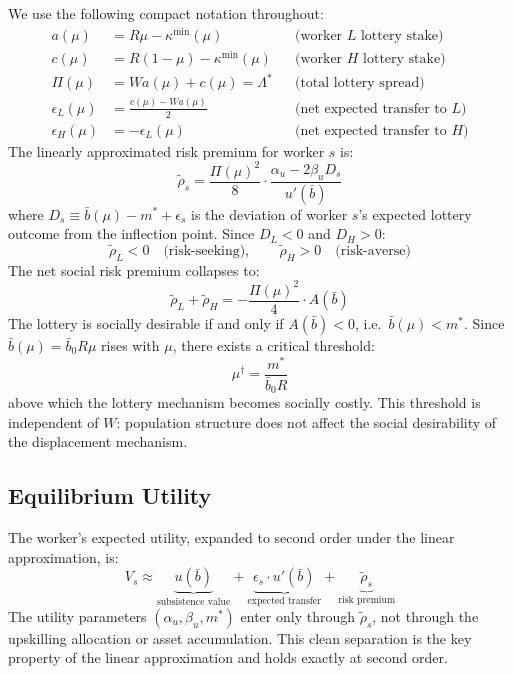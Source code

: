 \documentclass[12pt,a4paper]{article}
\begin{document}
We use the following compact notation throughout:
\begin{align}
  a(\mu) &= R\mu - \kappa^{\min}(\mu)
  && \text{(worker $L$ lottery stake)} \label{eq:a} \\
  c(\mu) &= R(1-\mu) - \kappa^{\min}(\mu)
  && \text{(worker $H$ lottery stake)} \label{eq:c} \\
  \Pi(\mu) &= Wa(\mu) + c(\mu) = \Lambda^*
  && \text{(total lottery spread)} \label{eq:Pi} \\
  \epsilon_L(\mu) &= \tfrac{c(\mu) - Wa(\mu)}{2}
  && \text{(net expected transfer to $L$)} \label{eq:epsilonL} \\
  \epsilon_H(\mu) &= -\epsilon_L(\mu)
  && \text{(net expected transfer to $H$)} \label{eq:epsilonH}
\end{align}
The linearly approximated risk premium for worker $s$ is:
\begin{equation}
  \tilde{\rho}_s = \frac{\Pi(\mu)^2}{8} \cdot
  \frac{\alpha_u - 2\beta_u D_s}{u'(\bar{b})}
  \label{eq:rho_linear}
\end{equation}
where $D_s \equiv \bar{b}(\mu) - m^* + \epsilon_s$ is the deviation of
worker $s$'s expected lottery outcome from the inflection point.
Since $D_L < 0$ and $D_H > 0$:
\begin{equation}
  \tilde{\rho}_L < 0 \quad \text{(risk-seeking)},
  \qquad
  \tilde{\rho}_H > 0 \quad \text{(risk-averse)}
  \label{eq:rho_signs}
\end{equation}
The net social risk premium collapses to:
\begin{equation}
  \tilde{\rho}_L + \tilde{\rho}_H
  = -\frac{\Pi(\mu)^2}{4} \cdot A(\bar{b})
  \label{eq:social_premium}
\end{equation}
The lottery is socially desirable if and only if $A(\bar{b}) < 0$,
i.e.\ $\bar{b}(\mu) < m^*$. Since $\bar{b}(\mu) = \bar{b}_0 R\mu$
rises with $\mu$, there exists a critical threshold:
\begin{equation}
  \mu^\dagger = \frac{m^*}{\bar{b}_0 R}
  \label{eq:mu_dagger}
\end{equation}
above which the lottery mechanism becomes socially costly. This
threshold is independent of $W$: population structure does not affect
the social desirability of the displacement mechanism.

\subsection{Equilibrium Utility}

The worker's expected utility, expanded to second order under the
linear approximation, is:
\begin{equation}
  V_s \approx
  \underbrace{u(\bar{b})}_{\text{subsistence value}}
  + \underbrace{\epsilon_s \cdot u'(\bar{b})}_{\text{expected transfer}}
  + \underbrace{\tilde{\rho}_s}_{\text{risk premium}}
  \label{eq:V_approx}
\end{equation}
The utility parameters $(\alpha_u, \beta_u, m^*)$ enter only through
$\tilde{\rho}_s$, not through the upskilling allocation or asset
accumulation. This clean separation is the key property of the linear
approximation and holds exactly at second order.
\end{document}
